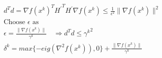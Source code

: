 \begin{enumerate}
\begin{align*}
	&d^T d = \nabla f(x^k)^T {H^\prime}^T H^\prime \nabla f(x^k) \leq \frac{1}{\epsilon^2} \| \nabla f(x^k) \|^2\\
	&\mbox{Choose $\epsilon$ as }\\
	&\epsilon = \frac{\| \nabla f(x^k) \|}{\gamma^k}\quad \Rightarrow d^Td \leq {\gamma^k}^2\\
	&\delta^k = max\{-eig(\nabla^2 f(x^k)),0\}+ \frac{\| \nabla f(x^k) \|}{\gamma^k}
\end{align*}
% 
% 
% 

\end{enumerate}
